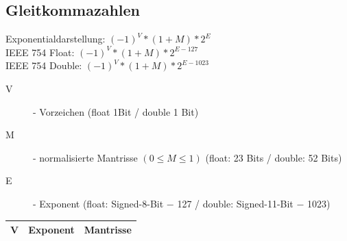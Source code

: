 \documentclass[a4paper,10pt]{article}
\begin{document}
\subsection{Gleitkommazahlen}
Exponentialdarstellung: $(-1)^V * (1+M)*2^E$ \\
IEEE 754 Float: $(-1)^V * (1+M) * 2^{E-127}$ \\
IEEE 754 Double: $(-1)^V * (1+M) * 2^{E-1023}$ \\
\begin{description}
	\item[V] - Vorzeichen (float 1Bit / double 1 Bit)
	\item[M] - normalisierte Mantrisse $(0 \leq M \leq 1)$ (float: 23 Bits / double: 52 Bits)
	\item[E] - Exponent (float: Signed-8-Bit $-$ 127  / double: Signed-11-Bit $-$ 1023)
\end{description} 
\begin{tabular}{|c|l|l|}
	\hline
	V & Exponent & Mantrisse \\
	\hline
\end{tabular}
\end{document}

